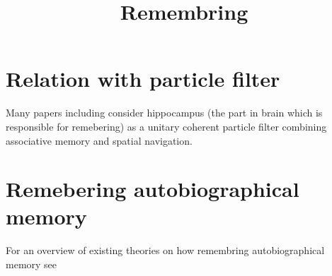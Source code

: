 \documentclass[a4paper]{article}
\title{Remembring}
\date{}
\begin{document}
    \maketitle
    
    
    \section{Relation with particle filter}
        Many papers including \cite{fox-2010-learning-in-a-unitary-coherent-hippocampus} consider hippocampus (the part in brain which is responsible for remebering) as a unitary coherent particle filter combining associative memory and spatial navigation.
    
    
    \section{Remebering autobiographical memory}
        For an overview of existing theories on how remembring autobiographical memory see \cite{sheldon-2019-a-neurocognitive-perspective-on-the-forms-and-functions-of-autobiographical-memory-retrieval}
        
        
        
\end{document}
